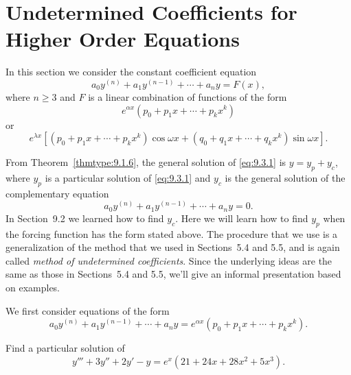 \section{Undetermined Coefficients for Higher Order Equations}

\noindent
In this section we consider the constant coefficient equation
\begin{equation}
  \label{eq:9.3.1}a_{0}y^{(n)}+a_{1}y^{(n-1)}+\cdots+a_{n}y=F(x),
\end{equation}
where $n\ge3$ and $F$ is a linear combination of functions of the form
\[
  e^{\alpha x}\left(p_{0}+p_{1}x+\cdots+p_{k}x^{k}\right)
\]
or
\[
  e^{\lambda x}\left[\left(p_{0}+p_{1}x+\cdots+p_{k}x^{k}\right) \cos\omega x+ \left(q_{0}+q_{1}x+\cdots+q_{k}x^{k}\right) \sin\omega x\right].
\]

From Theorem~\ref{thmtype:9.1.6}, the general solution of \eqref{eq:9.3.1} is $y=y_{p}+y_{c}$, where $y_{p}$ is a
particular solution of \eqref{eq:9.3.1} and $y_{c}$ is the general solution of the complementary
equation
\[
  a_{0}y^{(n)}+a_{1}y^{(n-1)}+\cdots+a_{n}y=0.
\]
In Section~9.2 we learned how to find $y_{c}$. Here we will learn how to find $y_{p}$ when the
forcing function has the form stated above. The procedure that we use is a generalization of the
method that we used in Sections~5.4 and 5.5, and is again called {\color{blue}\it method of
undetermined coefficients\/}. Since the underlying ideas are the same as those in Sections~5.4 and
5.5, we'll give an informal presentation based on examples.


\noindent
We first consider equations of the form
\[
  a_{0}y^{(n)}+a_{1}y^{(n-1)}+\cdots+a_{n}y=e^{\alpha x}\left(p_{0}+p_{1}x+\cdots+p_{k}x^{k}\right).
\]

\begin{example}
  \label{example:9.3.1} \rm Find a particular solution of
  \begin{equation}
    \label{eq:9.3.2}y'''+3y''+2y'-y=e^{x}(21+24x+28x^{2}+5x^{3}).
  \end{equation}
\end{example}

